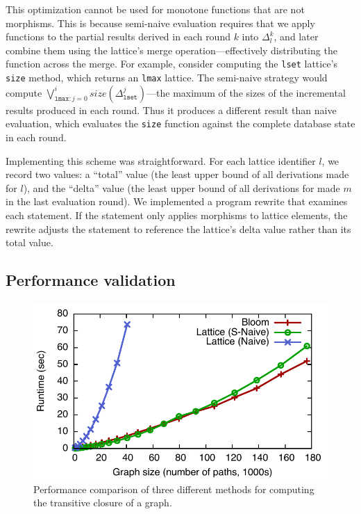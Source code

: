 This optimization cannot be used for monotone functions that are not
morphisms. This is because semi-naive evaluation requires that we apply
functions to the partial results derived in each round $k$ into $\Delta_l^k$,
and later combine them using the lattice's merge operation---effectively
distributing the function across the merge.  For example, consider computing the
\texttt{lset} lattice's \texttt{size} method, which returns an \texttt{lmax}
lattice. The semi-naive strategy would compute
$\bigvee_{\mathtt{lmax}:j=0}^i size(\Delta^j_{\mathtt{lset}})$---the maximum of
the sizes of the incremental results produced in each round.  Thus it produces a
different result than naive evaluation, which evaluates the \texttt{size}
function against the complete database state in each round.

Implementing this scheme was straightforward. For each lattice identifier $l$,
we record two values: a ``total'' value (the least upper bound of all
derivations made for $l$), and the ``delta'' value (the least upper bound of all
derivations for made $m$ in the last evaluation round). We implemented a program
rewrite that examines each \lang statement. If the statement only applies
morphisms to lattice elements, the rewrite adjusts the statement to reference
the lattice's delta value rather than its total value.


\subsection{Performance validation}
\label{sec:lattice-perf}
\begin{figure}[t]
\includegraphics[width=\linewidth]{fig/sn_perf}
\caption{Performance comparison of three different methods for computing the
  transitive closure of a graph.}
\label{fig:tc-perf-graph}
\end{figure}

